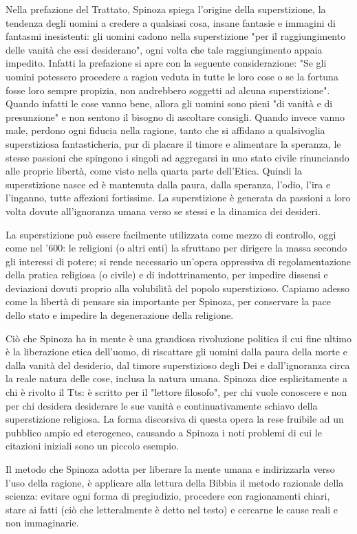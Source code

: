 Nella prefazione del Trattato, Spinoza spiega l'origine della superstizione, la tendenza degli uomini a credere a qualsiasi cosa, insane fantasie e immagini di fantasmi inesistenti: gli uomini cadono nella superstizione "per il raggiungimento delle vanità che essi
desiderano", ogni volta che tale raggiungimento appaia impedito. Infatti la prefazione si
apre con la seguente considerazione: "Se gli uomini potessero procedere a ragion veduta in tutte le
loro cose o se la fortuna fosse loro sempre propizia, non andrebbero soggetti ad alcuna
superstizione". Quando infatti le cose vanno bene, allora gli uomini sono pieni "di vanità e di
presunzione" e non sentono il bisogno di ascoltare consigli. Quando invece vanno
male, perdono ogni fiducia nella ragione, tanto che si affidano a qualsivoglia
superstiziosa fantasticheria, pur di placare il timore e alimentare la speranza, le stesse passioni che spingono i singoli ad aggregarsi in uno stato civile rinunciando alle proprie libertà, come visto nella quarta parte dell'Etica. Quindi la superstizione nasce ed è mantenuta dalla paura, dalla speranza, l'odio, l'ira e l'inganno, tutte affezioni fortissime. La superstizione è generata da passioni a loro volta dovute all'ignoranza umana verso se stessi e la dinamica dei desideri.

La superstizione può essere facilmente utilizzata come mezzo di controllo, oggi come nel '600: le religioni (o altri enti) la sfruttano per dirigere la massa secondo gli interessi di potere; si rende necessario un'opera oppressiva di regolamentazione della pratica religiosa (o civile) e di indottrinamento, per impedire dissensi e deviazioni dovuti proprio alla volubilità del popolo superstizioso. Capiamo adesso come la libertà di pensare sia importante per Spinoza, per conservare la pace dello stato e impedire la degenerazione della religione.

Ciò che Spinoza ha in mente è
una grandiosa rivoluzione politica il cui fine ultimo è la liberazione etica dell'uomo, di riscattare gli uomini dalla paura
della morte e dalla vanità del desiderio, dal timore superstizioso degli Dei e dall'ignoranza circa la
reale natura delle cose, inclusa la natura umana. Spinoza dice esplicitamente a chi è rivolto il Tts: è scritto per il "lettore filosofo", per chi vuole conoscere e non per chi desidera desiderare le sue vanità e continuativamente schiavo della superstizione religiosa. La forma  discorsiva di questa opera la rese fruibile ad un pubblico ampio ed eterogeneo, causando a Spinoza i noti problemi di cui le citazioni iniziali sono un piccolo esempio.

Il metodo che Spinoza adotta per liberare la mente umana e indirizzarla verso l'uso della ragione, è applicare alla lettura della Bibbia il metodo razionale
della scienza: evitare ogni forma di pregiudizio, procedere con ragionamenti chiari, stare ai fatti (ciò che
letteralmente è detto nel testo) e cercarne le cause reali e non immaginarie.









\newpage